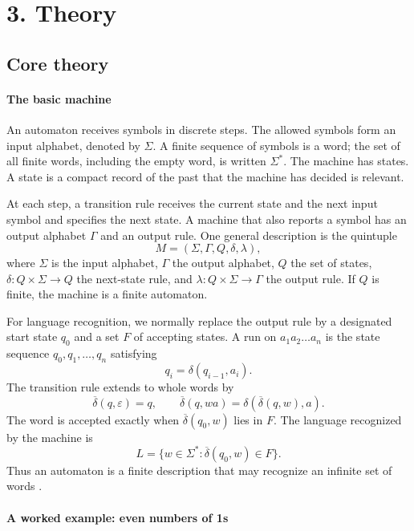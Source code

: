 \section*{3. Theory}
\subsection*{Core theory}
\paragraph{The basic machine}

An automaton receives symbols in discrete steps. The allowed symbols form an input alphabet, denoted by $\Sigma$. A finite sequence of symbols is a word; the set of all finite words, including the empty word, is written $\Sigma^*$. The machine has states. A state is a compact record of the past that the machine has decided is relevant.

At each step, a transition rule receives the current state and the next input symbol and specifies the next state. A machine that also reports a symbol has an output alphabet $\Gamma$ and an output rule. One general description is the quintuple
\[
 M=(\Sigma,\Gamma,Q,\delta,\lambda),
\]
where $\Sigma$ is the input alphabet, $\Gamma$ the output alphabet, $Q$ the set of states, $\delta:Q\times\Sigma\to Q$ the next-state rule, and $\lambda:Q\times\Sigma\to\Gamma$ the output rule. If $Q$ is finite, the machine is a finite automaton.

For language recognition, we normally replace the output rule by a designated start state $q_0$ and a set $F$ of accepting states. A run on $a_1a_2\ldots a_n$ is the state sequence $q_0,q_1,\ldots,q_n$ satisfying
\[
 q_i=\delta(q_{i-1},a_i).
\]
The transition rule extends to whole words by
\[
 \overline{\delta}(q,\varepsilon)=q,\qquad
 \overline{\delta}(q,wa)=\delta(\overline{\delta}(q,w),a).
\]
The word is accepted exactly when $\overline{\delta}(q_0,w)$ lies in $F$. The language recognized by the machine is
\[
 L=\{w\in\Sigma^*:\overline{\delta}(q_0,w)\in F\}.
\]
Thus an automaton is a finite description that may recognize an infinite set of words \cite{automata_theory_ref1,automata_theory_ref4}.

\paragraph{A worked example: even numbers of 1s}

